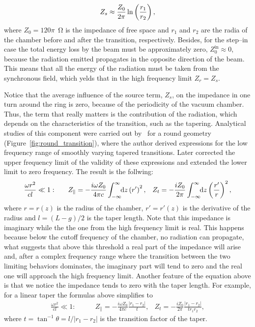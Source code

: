     \begin{align}\label{eq:transition_high_frequency}
        Z_s \approx \frac{Z_0}{2\pi}\ln\left(\frac{r_1}{r_2}\right),
    \end{align}
    where $Z_0 = 120\pi$~\si{\ohm} is the impedance of free space and $r_1$ and $r_2$ are the radia of the chamber before and after the transition, respectively. Besides, for the step--in case the total energy loss by the beam must be approximately zero, $Z_0^\text{in}\approx 0$, because the radiation emitted propagates in the opposite direction of the beam. This means that all the energy of the radiation must be taken from the synchronous field, which yelds that in the high frequency limit $Z_r = Z_s$.

    Notice that the average influence of the source term, $Z_s$, on the impedance in one turn around the ring is zero, because of the periodicity of the vacuum chamber. Thus, the term that really matters is the contribution of the radiation, which depends on the characteristics of the transition, such as the tapering. Analytical studies of this component were carried out by~ for a round geometry (Figure~\ref{fig:round_transition}), where the author derived expressions for the low frequency range of smoothly varying tapered transitions. Later  corrected the upper frequency limit of the validity of these expressions and extended the lower limit to zero frequency. The result is the follwing:
    \begin{align}
        \frac{\omega r^2}{cl}\ll1:\quad\quad
        &Z_\parallel = -\frac{i\omega Z_0}{4\pi c}\int_{-\infty}^{\infty}\!\!\text{d}z \left(r'\right)^2, &
        Z_t = -\frac{i Z_0}{2\pi}\int_{-\infty}^{\infty}\!\!\text{d}z \left(\frac{r'}{r}\right)^2,
    \end{align}
    where $r=r(z)$ is the radius of the chamber, $r'=r'(z)$ is the derivative of the radius and $l=(L-g)/2$ is the taper length. Note that this impedance is imaginary while the the one from the high frequency limit is real. This happens because below the cutoff frequency of the chamber, no radiation can propagate, what suggests that above this threshold a real part of the impedance will arise and, after a complex frequency range where the transition between the two limiting behaviors dominates, the imaginary part will tend to zero and the real one will approach the high frequency limit. Another feature of the equation above is that we notice the impedance tends to zero with the taper length. For example, for a linear taper the formulas above simplifies to
    \begin{align}
        \frac{\omega r^2}{cl}\ll1:\quad\quad
        &Z_\parallel = -\frac{i\omega Z_0}{4\pi c}\frac{|r_1-r_2|}{t}, &
        Z_t = -\frac{i Z_0}{2\pi}\frac{|r_1-r_2|}{tr_1r_2},
    \end{align}
    where $t=\tan^{-1}\theta=l/|r_1-r_2|$ is the transition factor of the taper.

